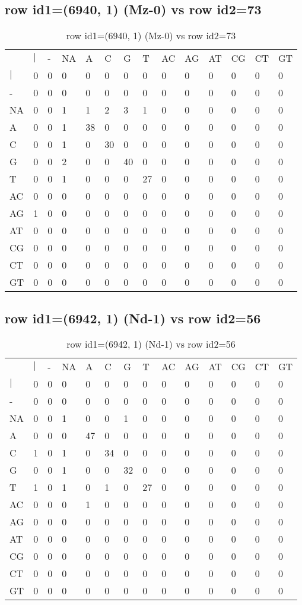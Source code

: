 \subsection{row id1=(6940, 1) (Mz-0) vs row id2=73}
\begin{center}
\begin{longtable}{|l|l|l|l|l|l|l|l|l|l|l|l|l|l|}
\caption{row id1=(6940, 1) (Mz-0) vs row id2=73} \label{table_dm148}\\
\hline
\\
\hline
&$|$&-&NA&A&C&G&T&AC&AG&AT&CG&CT&GT\\
$|$&0&0&0&0&0&0&0&0&0&0&0&0&0\\
-&0&0&0&0&0&0&0&0&0&0&0&0&0\\
NA&0&0&1&1&2&3&1&0&0&0&0&0&0\\
A&0&0&1&38&0&0&0&0&0&0&0&0&0\\
C&0&0&1&0&30&0&0&0&0&0&0&0&0\\
G&0&0&2&0&0&40&0&0&0&0&0&0&0\\
T&0&0&1&0&0&0&27&0&0&0&0&0&0\\
AC&0&0&0&0&0&0&0&0&0&0&0&0&0\\
AG&1&0&0&0&0&0&0&0&0&0&0&0&0\\
AT&0&0&0&0&0&0&0&0&0&0&0&0&0\\
CG&0&0&0&0&0&0&0&0&0&0&0&0&0\\
CT&0&0&0&0&0&0&0&0&0&0&0&0&0\\
GT&0&0&0&0&0&0&0&0&0&0&0&0&0\\
\hline
\end{longtable}
\end{center}

\subsection{row id1=(6942, 1) (Nd-1) vs row id2=56}
\begin{center}
\begin{longtable}{|l|l|l|l|l|l|l|l|l|l|l|l|l|l|}
\caption{row id1=(6942, 1) (Nd-1) vs row id2=56} \label{table_dm150}\\
\hline
\\
\hline
&$|$&-&NA&A&C&G&T&AC&AG&AT&CG&CT&GT\\
$|$&0&0&0&0&0&0&0&0&0&0&0&0&0\\
-&0&0&0&0&0&0&0&0&0&0&0&0&0\\
NA&0&0&1&0&0&1&0&0&0&0&0&0&0\\
A&0&0&0&47&0&0&0&0&0&0&0&0&0\\
C&1&0&1&0&34&0&0&0&0&0&0&0&0\\
G&0&0&1&0&0&32&0&0&0&0&0&0&0\\
T&1&0&1&0&1&0&27&0&0&0&0&0&0\\
AC&0&0&0&1&0&0&0&0&0&0&0&0&0\\
AG&0&0&0&0&0&0&0&0&0&0&0&0&0\\
AT&0&0&0&0&0&0&0&0&0&0&0&0&0\\
CG&0&0&0&0&0&0&0&0&0&0&0&0&0\\
CT&0&0&0&0&0&0&0&0&0&0&0&0&0\\
GT&0&0&0&0&0&0&0&0&0&0&0&0&0\\
\hline
\end{longtable}
\end{center}

